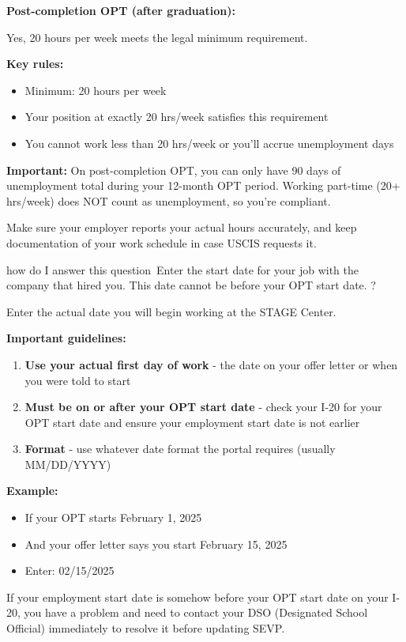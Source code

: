 \begin{botresponse}
\textbf{Post-completion OPT (after graduation):}

Yes, 20 hours per week meets the legal minimum requirement.

\textbf{Key rules:}

\begin{itemize}
\item Minimum: 20 hours per week
\item Your position at exactly 20 hrs/week satisfies this requirement
\item You cannot work less than 20 hrs/week or you'll accrue unemployment days
\end{itemize}

\textbf{Important:} On post-completion OPT, you can only have 90 days of unemployment total during your 12-month OPT period. Working part-time (20+ hrs/week) does NOT count as unemployment, so you're compliant.

Make sure your employer reports your actual hours accurately, and keep documentation of your work schedule in case USCIS requests it.
\end{botresponse}

\begin{userprompt}
how do I answer this question Enter the start date for your job with the company that hired you. This date cannot be before your OPT start date. ?
\end{userprompt}

\begin{botresponse}
Enter the actual date you will begin working at the STAGE Center.

\textbf{Important guidelines:}

\begin{enumerate}
\item \textbf{Use your actual first day of work} - the date on your offer letter or when you were told to start
\item \textbf{Must be on or after your OPT start date} - check your I-20 for your OPT start date and ensure your employment start date is not earlier
\item \textbf{Format} - use whatever date format the portal requires (usually MM/DD/YYYY)
\end{enumerate}

\textbf{Example:}

\begin{itemize}
\item If your OPT starts February 1, 2025
\item And your offer letter says you start February 15, 2025
\item Enter: 02/15/2025
\end{itemize}

If your employment start date is somehow before your OPT start date on your I-20, you have a problem and need to contact your DSO (Designated School Official) immediately to resolve it before updating SEVP.
\end{botresponse}

